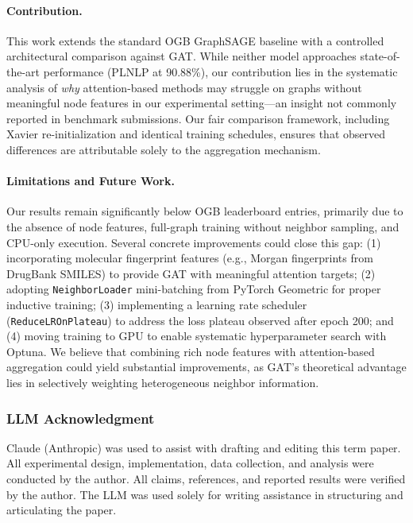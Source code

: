 \documentclass{article}
\begin{document}
\paragraph{Contribution.}
This work extends the standard OGB GraphSAGE baseline with a controlled architectural comparison against GAT. While neither model approaches state-of-the-art performance (PLNLP at 90.88\%), our contribution lies in the systematic analysis of \emph{why} attention-based methods may struggle on graphs without meaningful node features in our experimental setting---an insight not commonly reported in benchmark submissions. Our fair comparison framework, including Xavier re-initialization and identical training schedules, ensures that observed differences are attributable solely to the aggregation mechanism.

\paragraph{Limitations and Future Work.}
Our results remain significantly below OGB leaderboard entries, primarily due to the absence of node features, full-graph training without neighbor sampling, and CPU-only execution. Several concrete improvements could close this gap: (1) incorporating molecular fingerprint features (e.g., Morgan fingerprints from DrugBank SMILES) to provide GAT with meaningful attention targets; (2) adopting \texttt{NeighborLoader} mini-batching from PyTorch Geometric for proper inductive training; (3) implementing a learning rate scheduler (\texttt{ReduceLROnPlateau}) to address the loss plateau observed after epoch 200; and (4) moving training to GPU to enable systematic hyperparameter search with Optuna. We believe that combining rich node features with attention-based aggregation could yield substantial improvements, as GAT's theoretical advantage lies in selectively weighting heterogeneous neighbor information.


\subsubsection*{LLM Acknowledgment}

Claude (Anthropic) was used to assist with drafting and editing this term paper. All experimental design, implementation, data collection, and analysis were conducted by the author. All claims, references, and reported results were verified by the author. The LLM was used solely for writing assistance in structuring and articulating the paper.
\end{document}
